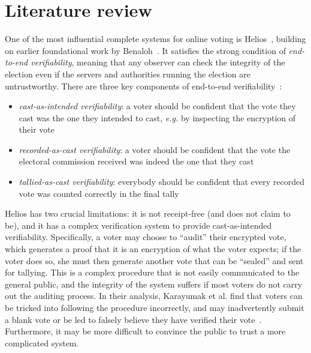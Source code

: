 \documentclass[12pt,a4paper]{article}
\theoremstyle{definition}
\newcommand{\eg}{\textit{e.g. }}
\begin{document}

\section{Literature review}\label{sec-litrev}
One of the most influential complete systems for online voting is Helios~\cite{adida2008helios}, building on earlier foundational work by Benaloh~\cite{benaloh2006simple}. It satisfies the strong condition of \textit{end-to-end verifiability}, meaning that any observer can check the integrity of the election even if the servers and authorities running the election are untrustworthy. There are three key components of end-to-end verifiability~\cite{DBLP:journals/corr/BenalohRRSTV15}:

\begin{itemize}
    \item \textit{cast-as-intended verifiability}: a voter should be confident that the vote they cast was the one they intended to cast, \eg by inspecting the encryption of their vote
    \item \textit{recorded-as-cast verifiability}: a voter should be confident that the vote the electoral commission received was indeed the one that they cast
    \item \textit{tallied-as-cast verifiability}: everybody should be confident that every recorded vote was counted correctly in the final tally
\end{itemize}

Helios has two crucial limitations: it is not receipt-free (and does not claim to be), and it has a complex verification system to provide cast-as-intended verifiability. Specifically, a voter may choose to ``audit'' their encrypted vote, which generates a proof that it is an encryption of what the voter expects; if the voter does so, she must then generate another vote that can be ``sealed'' and sent for tallying. This is a complex procedure that is not easily communicated to the general public, and the integrity of the system suffers if most voters do not carry out the auditing process. In their analysis, Karayumak et al. find that voters can be tricked into following the procedure incorrectly, and may inadvertently submit a blank vote or be led to falsely believe they have verified their vote~\cite{karayumak2011usability}. Furthermore, it may be more difficult to convince the public to trust a more complicated system.
\end{document}
